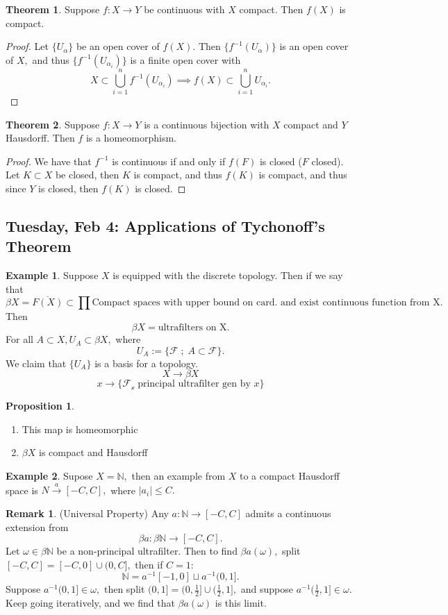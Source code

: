 \documentclass[10pt, oneside]{article}
\newcommand{\bbN}{\mathbb{N}}
\theoremstyle{definition}
\newtheorem{exmp}{Example}[section]
\newtheorem{thm}{Theorem}
\newtheorem{prop}{Proposition}
\newtheorem{rem}{Remark}
\begin{document}
\begin{thm}
    Suppose $f: X\to Y$ be continuous with $X$ compact. Then $f(X)$ is compact.
\end{thm}
\begin{proof}
    Let $\{U_\alpha\}$ be an open cover of $f(X).$ Then $\{f^{-1}(U_\alpha)\}$ is an open cover of $X,$ and thus $\{f^{-1}(U_{\alpha_i})\}$ is a finite open cover with 
    \[X \subset \bigcup_{i=1}^n f^{-1}(U_{\alpha_i}) \implies f(X) \subset \bigcup_{i=1}^n U_{\alpha_i}.\]
\end{proof}
\begin{thm}
    Suppose $f: X\to Y$ is a continuous bijection with $X$ compact and $Y$ Hausdorff. Then $f$ is a homeomorphism.
\end{thm}
\begin{proof}
    We have that $f^{-1}$ is continuous if and only if $f(F)$ is closed ($F$ closed). Let $K\subset X$ be closed, then $K$ is compact, and thus $f(K)$ is compact, and thus since $Y$ is closed, then $f(K)$ is closed. 
\end{proof}

\newpage
\subsection{Tuesday, Feb 4: Applications of Tychonoff's Theorem}
\begin{exmp}
    Suppose $X$ is equipped with the discrete topology. Then if we say that 
    \[\beta X = \overline{F(X)}\subset \prod \text{Compact spaces with upper bound on card. and exist continuous function from X}.\] Then 
    \[\beta X = \text{ultrafilters on X}.\] For all $A\subset X, U_A\subset \beta X,$ where 
    \[U_A := \{\mathcal{F}\; ; \; A\subset \mathcal{F}\}.\] We claim that $\{U_A\}$ is a basis for a topology. 
    \[X\to \beta X\]
    \[x \to \{\mathcal{F_x} \; \text{principal ultrafilter gen by $x$}\}\]
\end{exmp}
\begin{prop}
    \begin{enumerate}
        \item This map is homeomorphic
        \item $\beta X$ is compact and Hausdorff
    \end{enumerate}
\end{prop}

\begin{exmp}
    Supose $X = \bbN,$ then an example from $X$ to a compact Hausdorff space is $N\xrightarrow{a} [-C,C],$ where $|a_i| \leq C.$
\end{exmp}
\begin{rem}
    (Universal Property) Any $a: \bbN \to [-C, C]$ admits a continuous extension from 
    \[\beta a: \beta \bbN \to [-C, C].\] Let $\omega \in \beta \bbN$ be a non-principal ultrafilter. Then to find $\beta a(\omega),$ split $[-C, C] = [-C, 0] \cup (0, C],$ then if $C = 1:$
    \[\bbN = a^{-1}[-1,0] \sqcup a^{-1}(0,1].\] Suppose $a^{-1}(0,1] \in \omega, $ then split $(0,1] = (0,\frac{1}{2}] \cup (\frac{1}{2}, 1],$ and suppose $a^{-1}(\frac{1}{2}, 1] \in \omega.$ Keep going iteratively, and we find that $\beta a(\omega)$ is this limit.
\end{rem}
\end{document}
